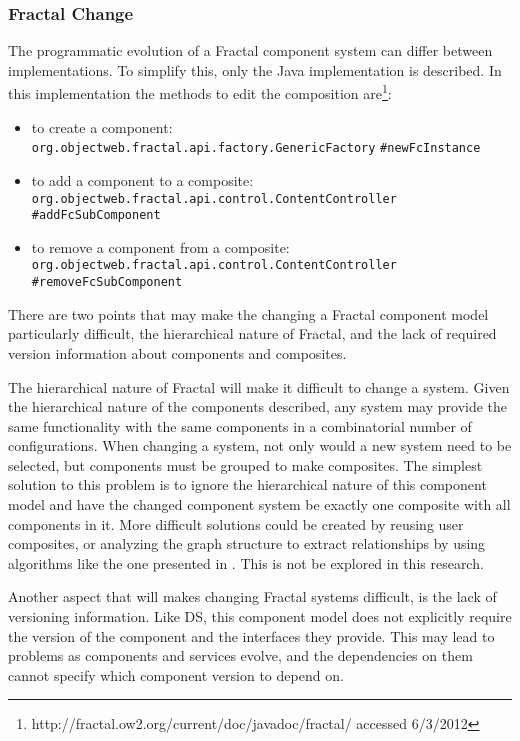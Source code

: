 \subsubsection{Fractal Change}
The programmatic evolution of a Fractal component system can differ between implementations.
To simplify this, only the Java implementation is described. 
In this implementation the methods to edit the composition are\footnote{http://fractal.ow2.org/current/doc/javadoc/fractal/ accessed 6/3/2012}:
\begin{itemize}
  \item to create a component: \\ \texttt{org.objectweb.fractal.api.factory.GenericFactory} \verb+#+\texttt{newFcInstance}
  \item to add a component to a composite: \\ \texttt{org.objectweb.fractal.api.control.ContentController} \verb+#+\texttt{addFcSubComponent}
  \item to remove a component from a composite: \\ \texttt{org.objectweb.fractal.api.control.ContentController} \verb+#+\texttt{removeFcSubComponent}
\end{itemize}

There are two points that may make the changing a Fractal component model particularly difficult,
the hierarchical nature of Fractal, and the lack of required version information about components and composites.

The hierarchical nature of Fractal will make it difficult to change a system. 
Given the hierarchical nature of the components described, any system may provide the same functionality with the same components in a combinatorial number of configurations.
When changing a system, not only would a new system need to be selected, but components must be grouped to make composites.
The simplest solution to this problem is to ignore the hierarchical nature of this component model
and have the changed component system be exactly one composite with all components in it.
More difficult solutions could be created by reusing user composites,
or analyzing the graph structure to extract relationships by using algorithms like the one presented in \citep{dietrich2008cluster}.
This is not be explored in this research.

Another aspect that will makes changing Fractal systems difficult, is the lack of versioning information.
Like DS, this component model does not explicitly require the version of the component and the interfaces they provide.
This may lead to problems as components and services evolve, and the dependencies on them cannot specify which component version to depend on.

